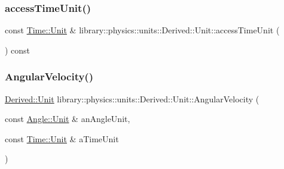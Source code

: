 \mbox{\label{classlibrary_1_1physics_1_1units_1_1_derived_1_1_unit_ac3537b9e186bc78b7d8ca405206cb272}} 
\subsubsection{\texorpdfstring{access\+Time\+Unit()}{accessTimeUnit()}}
{\footnotesize\ttfamily const \hyperlink{classlibrary_1_1physics_1_1units_1_1_time_ab876a6a05c9a2f28905f2753bfd64109}{Time\+::\+Unit} \& library\+::physics\+::units\+::\+Derived\+::\+Unit\+::access\+Time\+Unit (\begin{DoxyParamCaption}{ }\end{DoxyParamCaption}) const}

\mbox{\label{classlibrary_1_1physics_1_1units_1_1_derived_1_1_unit_addd355a633d2d5addd72efdd7cfebc65}} 
\subsubsection{\texorpdfstring{Angular\+Velocity()}{AngularVelocity()}}
{\footnotesize\ttfamily \hyperlink{classlibrary_1_1physics_1_1units_1_1_derived_1_1_unit}{Derived\+::\+Unit} library\+::physics\+::units\+::\+Derived\+::\+Unit\+::\+Angular\+Velocity (\begin{DoxyParamCaption}\item[{const \hyperlink{classlibrary_1_1physics_1_1units_1_1_angle_a3c329d415a61783b16ce481874cc5956}{Angle\+::\+Unit} \&}]{an\+Angle\+Unit,  }\item[{const \hyperlink{classlibrary_1_1physics_1_1units_1_1_time_ab876a6a05c9a2f28905f2753bfd64109}{Time\+::\+Unit} \&}]{a\+Time\+Unit }\end{DoxyParamCaption})\hspace{0.3cm}{\ttfamily [static]}}

